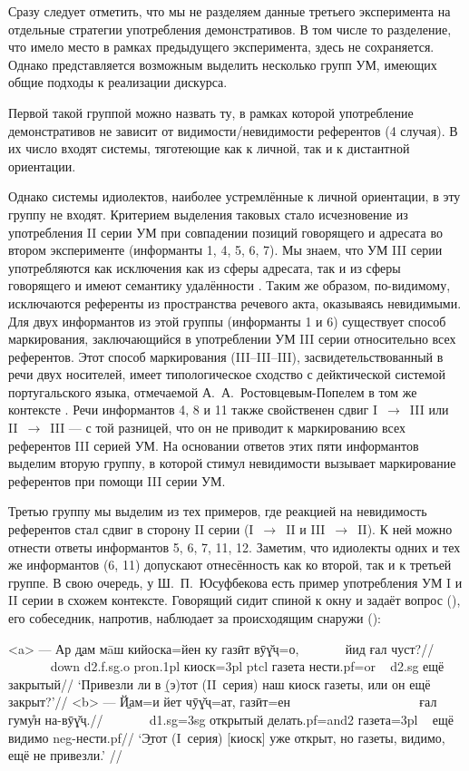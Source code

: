 Сразу следует отметить, что мы не разделяем данные третьего эксперимента на отдельные стратегии употребления демонстративов. В том числе то разделение, что имело место в рамках предыдущего эксперимента, здесь не сохраняется. Однако представляется возможным выделить несколько групп УМ, имеющих общие подходы к реализации дискурса.

Первой такой группой можно назвать ту, в рамках которой употребление демонстративов не зависит от видимости/невидимости референтов (4 случая). В их число входят системы, тяготеющие как к личной, так и к дистантной ориентации.

Однако системы идиолектов, наиболее устремлённые к личной ориентации, в эту группу не входят. Критерием выделения таковых стало исчезновение из употребления II серии УМ при совпадении позиций говорящего и адресата во втором эксперименте (информанты 1, 4, 5, 6, 7). Мы знаем, что УМ III серии употребляются как исключения как из сферы адресата, так и из сферы говорящего и имеют семантику удалённости \parencite[32]{yusufbekov1998}. Таким же образом, по-видимому, исключаются референты из пространства речевого акта, оказываясь невидимыми. Для двух информантов из этой группы (информанты 1 и 6) существует способ маркирования, заключающийся в употреблении УМ III серии относительно всех референтов. Этот способ маркирования (III–III–III), засвидетельствованный в речи двух носителей, имеет типологическое сходство с дейктической системой португальского языка, отмечаемой А.~А.~Ростовцевым-Попелем в том же контексте \parencite[30]{popiel2009}. Речи информантов 4, 8 и 11 также свойственен сдвиг I~$\rightarrow$~III или II~$\rightarrow$~III — с той разницей, что он не приводит к маркированию всех референтов III серией УМ. На основании ответов этих пяти информантов выделим вторую группу, в которой стимул невидимости вызывает маркирование референтов при помощи III серии УМ.

Третью группу мы выделим из тех примеров, где реакцией на невидимость референтов стал сдвиг в сторону II серии (I~$\rightarrow$~II и III~$\rightarrow$~II). К ней можно отнести ответы информантов 5, 6, 7, 11, 12. Заметим, что идиолекты одних и тех же информантов (6, 11) допускают отнесённость как ко второй, так и к третьей группе. В свою очередь, у Ш.~П.~Юсуфбекова есть пример употребления УМ I и II серии в схожем контексте. Говорящий сидит спиной к окну и задаёт вопрос (), его собеседник, напротив, наблюдает за происходящим снаружи ():

\a<a> \begingl
\gla — Ар \b{дам} мāш кийоска=йен ку газӣт вӯɣ̌ҷ=о, ~~~~~~ йид ғал чуст?//
\glc ~~~~~~ {\sc down} {\sc d2.f.sg.o} {\sc pron.1pl} киоск={\sc 3pl} {\sc ptcl} газета нести.{\sc pf=or} ~ {\sc d2.sg} ещё закрытый//
\glft ‘Привезли ли в \b{(э)тот} (II~серия) наш киоск газеты, или он ещё закрыт?’//
\endgl
\a<b> \begingl
\gla — \b{Йам}=и йет чӯɣ̌ҷ=ат, газӣт=ен ~~~~~~~~~~~~~~~~~~~ ғал гуму̊н на-вӯɣ̌ҷ.//
\glc ~~~~~~ {\sc d1.sg=3sg} открытый делать.{\sc pf=and2} газета={\sc 3pl} ~ ещё видимо {\sc neg}-нести.{\sc pf}//
\glft ‘\b{Этот} (I~серия) [киоск] уже открыт, но газеты, видимо, ещё не привезли.’ //
\endgl \xe

